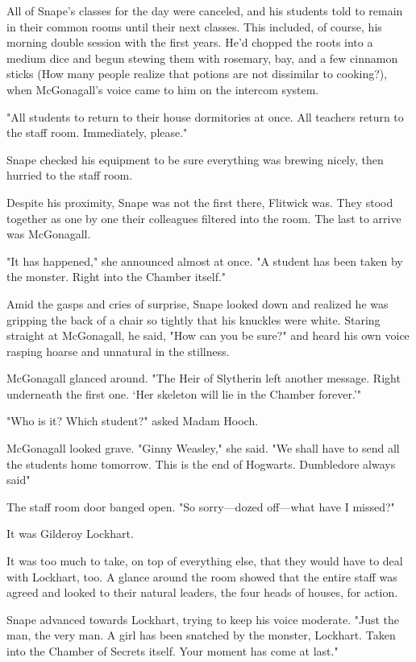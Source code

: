 All of Snape's classes for the day were canceled, and his students told to remain in their common rooms until their next classes. This included, of course, his morning double session with the first years. He'd chopped the roots into a medium dice and begun stewing them with rosemary, bay, and a few cinnamon sticks (How many people realize that potions are not dissimilar to cooking?), when McGonagall's voice came to him on the intercom system.

"All students to return to their house dormitories at once. All teachers return to the staff room. Immediately, please."

Snape checked his equipment to be sure everything was brewing nicely, then hurried to the staff room.

Despite his proximity, Snape was not the first there, Flitwick was. They stood together as one by one their colleagues filtered into the room. The last to arrive was McGonagall.

"It has happened," she announced almost at once. "A student has been taken by the monster. Right into the Chamber itself."

Amid the gasps and cries of surprise, Snape looked down and realized he was gripping the back of a chair so tightly that his knuckles were white. Staring straight at McGonagall, he said, "How can you be sure?" and heard his own voice rasping hoarse and unnatural in the stillness.

McGonagall glanced around. "The Heir of Slytherin left another message. Right underneath the first one. `Her skeleton will lie in the Chamber forever.'"

"Who is it? Which student?" asked Madam Hooch.

McGonagall looked grave. "Ginny Weasley," she said. "We shall have to send all the students home tomorrow. This is the end of Hogwarts. Dumbledore always said{\el}"

The staff room door banged open. "So sorry—dozed off—what have I missed?"

It was Gilderoy Lockhart.

It was too much to take, on top of everything else, that they would have to deal with Lockhart, too. A glance around the room showed that the entire staff was agreed and looked to their natural leaders, the four heads of houses, for action.

Snape advanced towards Lockhart, trying to keep his voice moderate. "Just the man, the very man. A girl has been snatched by the monster, Lockhart. Taken into the Chamber of Secrets itself. Your moment has come at last."

